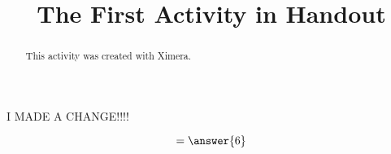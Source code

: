 \documentclass[handout]{ximera}
\title{The First Activity in Handout}
\begin{document}
  
\begin{abstract}  
This activity was created with Ximera.
\end{abstract}  
\maketitle


I MADE A CHANGE!!!!


\begin{problem}  
  \begin{prompt}
    \[
    = \answer{6}
    \]
  \end{prompt}
\end{problem}
\end{document}
